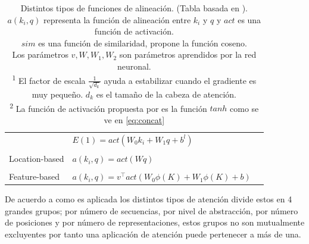 \begin{table}[ht!]
\begin{center}
\begin{tabular}{@{}lll@{}}
    & $E(1) = act(W_0k_i + W_1q + b^l)$ &  \\ \\
Location-based & $a(k_i, q) = act(W q)$ & \citeauthor{DBLP:journals/corr/LuongPM15} \\ \\
Feature-based & $a(k_i, q) = v^\top act(W_0 \phi(K) + W_1 \phi(K) + b)$ & \citeauthor{DBLP:journals/corr/abs-1810-10126} \\
\bottomrule
\end{tabular}
\end{center}
\caption{Distintos tipos de funciones de alineación. (Tabla basada en \cite{DBLP:journals/corr/abs-1904-02874} \cite{weng2018attention}). \\
$a(k_i, q)$ representa la función de alineación entre $k_i$ y $q$ y $act$ es una función de activación. \\
$sim$ es una función de similaridad, \citeauthor*{DBLP:journals/corr/GravesWD14} propone la función coseno.\\
Los parámetros $v, W, W_1, W_2$ son parámetros aprendidos por la red neuronal.\\
\textsuperscript{1} El factor de escala $\frac{1}{\sqrt{d_k}}$ ayuda a estabilizar cuando el
gradiente es muy pequeño. $d_k$ es el tamaño de la cabeza de atención.\\
\textsuperscript{2} La función de activación propuesta por \citeauthor{bahdanau2016neural} es la función $tanh$ como se ve en \ref{eq:concat} \\
\label{Tab:att}}
\end{table}

De acuerdo a como es aplicada los distintos tipos de atención \citeauthor{DBLP:journals/corr/abs-1904-02874}
divide estos en 4 grandes grupos; por número de secuencias, por nivel de abstracción, por número de
posiciones y por número de representaciones, estos grupos no son mutualmente excluyentes por tanto
una aplicación de atención puede pertenecer a más de una.

